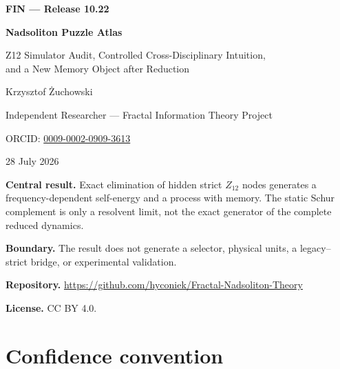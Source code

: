 \documentclass[11pt,a4paper,openany]{report}
\begin{document}
\hypersetup{pageanchor=false}
\begin{titlepage}
\centering
\vspace*{12mm}
{\Large\bfseries FIN --- Release 10.22\par}
\vspace{12mm}
{\Huge\bfseries Nadsoliton Puzzle Atlas\par}
\vspace{6mm}
{\Large Z12 Simulator Audit, Controlled Cross-Disciplinary Intuition,\\
and a New Memory Object after Reduction\par}
\vspace{18mm}
{\Large Krzysztof \.Zuchowski\par}
\vspace{2mm}
{\normalsize Independent Researcher --- Fractal Information Theory Project\par}
\vspace{2mm}
{\normalsize ORCID: \href{https://orcid.org/0009-0002-0909-3613}{0009-0002-0909-3613}\par}
\vspace{10mm}
{\large 28 July 2026\par}
\vfill
\begin{minipage}{0.89\textwidth}
\small
\textbf{Central result.} Exact elimination of hidden strict \(Z_{12}\) nodes
generates a frequency-dependent self-energy and a process with memory.
The static Schur complement is only a resolvent limit, not the exact generator
of the complete reduced dynamics.

\medskip
\textbf{Boundary.} The result does not generate a selector, physical units,
a legacy--strict bridge, or experimental validation.

\medskip
\textbf{Repository.}
\url{https://github.com/hyconiek/Fractal-Nadsoliton-Theory}

\textbf{License.} CC BY 4.0.
\end{minipage}
\vfill
\end{titlepage}
\hypersetup{pageanchor=true}
\tableofcontents
\clearpage
{}

\chapter*{Confidence convention}
\end{document}
